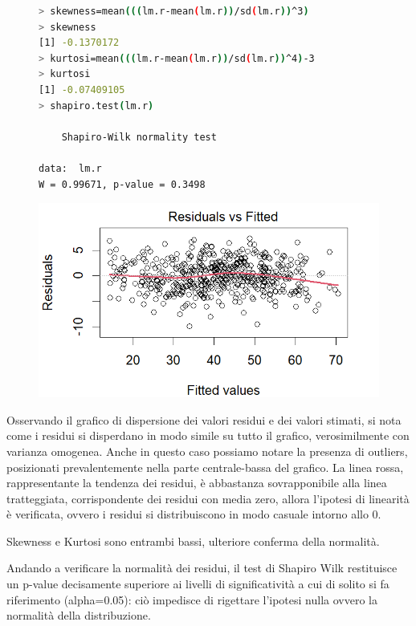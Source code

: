 \documentclass[11pt,a4paper]{article}
\begin{document}
\begin{figure}[h]
    \hspace{-2.00cm}
    \begin{minipage}{.6\textwidth} 
    	\begin{lstlisting}[language=bash,basicstyle=\tiny,tabsize=2,frame = single]
> skewness=mean(((lm.r-mean(lm.r))/sd(lm.r))^3)
> skewness
[1] -0.1370172
> kurtosi=mean(((lm.r-mean(lm.r))/sd(lm.r))^4)-3
> kurtosi
[1] -0.07409105
> shapiro.test(lm.r)
        
	Shapiro-Wilk normality test
        
data:  lm.r
W = 0.99671, p-value = 0.3498
        \end{lstlisting}
    \end{minipage}
    \hspace{0.07\textwidth}%
    \begin{minipage}{0.5\textwidth} 
    	\includegraphics[scale=.45]{imgs/residuals_linear_model.png}
    \end{minipage}
\end{figure}
Osservando il grafico di dispersione dei valori residui e dei valori stimati, si nota come i residui si disperdano in modo simile su tutto il grafico, verosimilmente con varianza omogenea. Anche in questo caso possiamo notare la presenza di outliers, posizionati prevalentemente nella parte centrale-bassa del grafico. La linea rossa, rappresentante la tendenza dei residui, è abbastanza sovrapponibile alla linea tratteggiata, corrispondente dei residui con media zero, allora l’ipotesi di linearità è verificata, ovvero i residui si distribuiscono in modo casuale intorno allo 0.

Skewness e Kurtosi sono entrambi bassi, ulteriore conferma della normalità.

Andando a verificare la normalità dei residui, il test di Shapiro Wilk restituisce un p-value decisamente superiore ai livelli di significatività a cui di solito si fa riferimento (alpha=0.05): ciò impedisce di rigettare l'ipotesi nulla ovvero la normalità della distribuzione.
\end{document}
